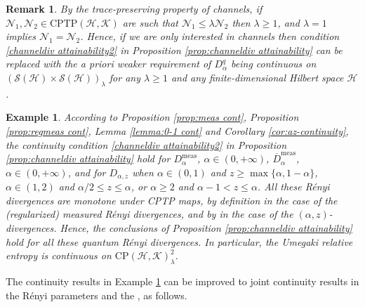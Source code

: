 \documentclass[unsortedaddress,superscriptaddress,pra,notitlepage]{revtex4}
\newtheorem{rem}[definition]{Remark}
\newtheorem{example}[definition]{Example}
\def\N{\mathcal{N}}
\def\S{{\mathcal S}}
\def\hil{{\mathcal H}}
\def\kil{{\mathcal K}}
\def\oll{\overline}
\def\CP{\mathrm{CP}}
\def\cptp{\mathrm{CPTP}}
\def\meas{\mathrm{meas}}
\def\cpso{\text{CPSO} }
\def\cpsos{\text{CPSOs} }
\begin{document}
\begin{rem}
By the trace-preserving property of channels, if $\N_1,\N_2\in\cptp(\hil,\kil)$
are such that 
$\N_1\le\lambda\N_2$ then $\lambda\ge 1$, and $\lambda=1$ implies $\N_1=\N_2$.
Hence, if we are only interested in channels then condition \ref{channeldiv attainability2} in 
Proposition \ref{prop:channeldiv attainability}
can be replaced with the a priori weaker requirement of 
$D_{\alpha}^q$ being continuous on $(\S(\hil)\times\S(\hil))_{\lambda}$ for any 
$\lambda\ge 1$ and any finite-dimensional Hilbert space $\hil$.
\end{rem}

\begin{example}\label{ex:chdiv cont in channels}
According to Proposition \ref{prop:meas cont}, Proposition \ref{prop:regmeas cont}, 
Lemma \ref{lemma:0-1 cont} and Corollary \ref{cor:az-continuity}, the
continuity condition \ref{channeldiv attainability2} in Proposition \ref{prop:channeldiv attainability}
hold for $D_{\alpha}^{\meas}$, $\alpha\in(0,+\infty)$,
$\oll{D}_{\alpha}^{\meas}$, $\alpha\in(0,+\infty)$, and
for $D_{\alpha,z}$
when $\alpha\in(0,1)$ and $z\ge\max\{\alpha,1-\alpha\}$, 
$\alpha\in(1,2)$ and $\alpha/2\le z\le\alpha$, or 
$\alpha\ge 2$ and $\alpha-1<z\le\alpha$.
All these R\'enyi divergences are monotone under CPTP  maps,
by definition in the case of the (regularized) measured R\'enyi divergences, and by 
\cite{Zhang2018} in the case of the $(\alpha,z)$-divergences. Hence, 
the conclusions of Proposition \ref{prop:channeldiv attainability} hold 
for all these quantum R\'enyi divergences. In particular, 
the \cpso Umegaki relative entropy is continuous on $\CP(\hil,\kil)^2_{\lambda}$.
\end{example}
\medskip

The continuity results in Example \ref{ex:chdiv cont in channels}
can be improved to 
joint continuity results in the R\'enyi parameters and the \cpsos,
as follows.
\end{document}
